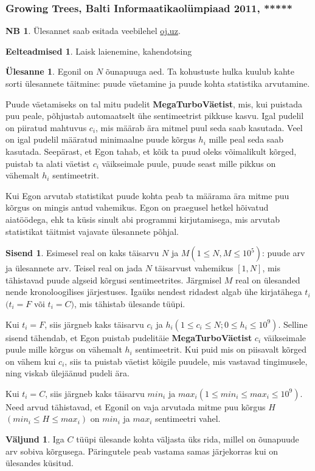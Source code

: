 \documentclass{trkut}
\theoremstyle{definition}
\newtheorem*{prereq}{Eelteadmised}
\newtheorem*{extra}{NB}
\newtheorem*{Input}{Sisend}
\newtheorem*{Output}{Väljund}
\newtheorem*{Text}{Ülesanne}
\begin{document}
\subsubsection{Growing Trees, Balti Informaatikaolümpiaad 2011, *****}
\begin{extra}
Ülesannet saab esitada veebilehel \href{https://oj.uz/problem/view/BOI11_grow}{oj.uz}.
\end{extra}
\begin{prereq}
Laisk laienemine, kahendotsing
\end{prereq}
\begin{Text}
Egonil on $N$ õunapuuga aed. Ta kohustuste hulka kuulub kahte sorti ülesannete täitmine: puude väetamine ja puude kohta statistika arvutamine.

Puude väetamiseks on tal mitu pudelit \textbf{MegaTurboVäetist}, mis, kui puistada puu peale, põhjustab automaatselt ühe sentimeetrist pikkuse kasvu. Igal pudelil on piiratud mahtuvus $c_i$, mis määrab ära mitmel puul seda saab kasutada. Veel on igal pudelil määratud minimaalne puude kõrgus $h_i$ mille peal seda saab kasutada.
Seepärast, et Egon tahab, et kõik ta puud oleks võimalikult kõrged, puistab ta alati väetist $c_i$ väikseimale puule, puude seast mille pikkus on vähemalt $h_i$ sentimeetrit.

Kui Egon arvutab statistikat puude kohta peab ta määrama ära mitme puu kõrgus on mingis antud vahemikus. Egon on praegusel hetkel hõivatud aiatöödega, ehk ta küsis sinult abi programmi kirjutamisega, mis arvutab statistikat täitmist vajavate ülesannete põhjal.
\end{Text}

\begin{Input}
Esimesel real on kaks täisarvu $N$ ja $M$$(1\le N,M\le 10^5)$: puude arv ja ülesannete arv. Teisel real on jada $N$ täisarvust vahemikus $[1,N]$, mis tähistavad puude algseid kõrgusi sentimeetrites. Järgmisel $M$ real on ülesanded nende kronoloogilises järjestuses. Igaüks nendest ridadest algab ühe kirjatähega $t_i$$(t_i=F$ või $t_i=C)$, mis tähistab ülesande tüüpi.

Kui $t_i=F$, siis järgneb kaks täisarvu $c_i$ ja $h_i$$(1\le c_i\le N; 0\le h_i\le 10^9)$. Selline sisend tähendab, et Egon puistab pudelitäie \textbf{MegaTurboVäetist} $c_i$ väikseimale puule mille kõrgus on vähemalt $h_i$ sentimeetrit. Kui puid mis on piisavalt kõrged on vähem kui $c_i$, siis ta puistab väetist kõigile puudele, mis vastavad tingimusele, ning viskab ülejäänud pudeli ära.

Kui $t_i=C$, siis järgneb kaks täisarvu $min_i$ ja $max_i$$(1\le min_i\le max_i\le 10^9)$. Need arvud tähistavad, et Egonil on vaja arvutada mitme puu kõrgus $H$$(min_i\le H\le max_i)$ on $min_i$ ja $max_i$ sentimeetri vahel.
\end{Input}
\begin{Output}
Iga $C$ tüüpi ülesande kohta väljasta üks rida, millel on õunapuude arv sobiva kõrgusega. Päringutele peab vastama samas järjekorras kui on ülesandes küsitud.
\end{Output}
\end{document}

